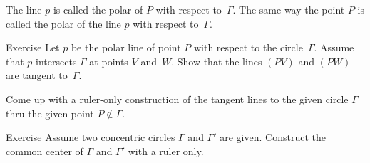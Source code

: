 The line $p$ is called the polar of $P$ with respect to~$\Gamma$.
The same way the point $P$ is called the polar of the line $p$ with respect to~$\Gamma$.



\begin{thm}{Exercise}\label{ex:tangent ruler}
Let $p$ be the polar line of point $P$ with respect to the circle~$\Gamma$.
Assume that $p$ intersects $\Gamma$ at points $V$ and~$W$.
Show that the lines $(PV)$ and $(PW)$ are tangent to~$\Gamma$.

Come up with a ruler-only construction of the tangent lines to the given circle $\Gamma$ thru the given point $P\notin\Gamma$.
\end{thm}

\begin{thm}{Exercise}\label{ex:concentric-circ}
Assume two concentric circles $\Gamma$ and $\Gamma'$ are given.
Construct the common center of $\Gamma$ and $\Gamma'$ with a ruler only.
\end{thm}


